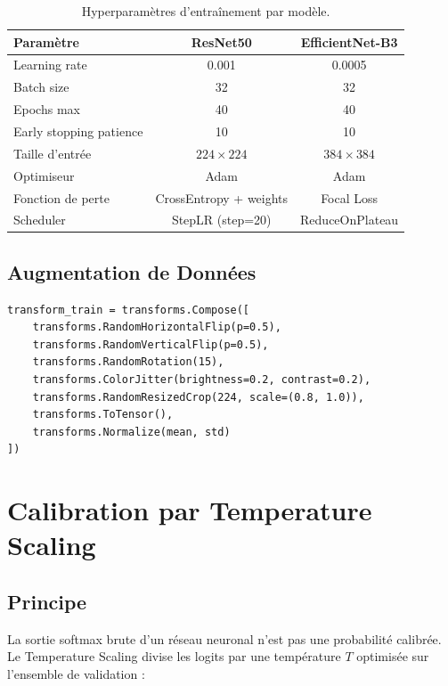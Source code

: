 \documentclass[12pt,a4paper,oneside]{report}
\begin{document}
\begin{table}[H]
\centering
\caption{Hyperparamètres d'entraînement par modèle.}
\label{tab:hyperparams}
\begin{tabular}{|l|c|c|}
\hline
\textbf{Paramètre} & \textbf{ResNet50} & \textbf{EfficientNet-B3} \\
\hline
Learning rate & 0.001 & 0.0005 \\
Batch size & 32 & 32 \\
Epochs max & 40 & 40 \\
Early stopping patience & 10 & 10 \\
Taille d'entrée & $224 \times 224$ & $384 \times 384$ \\
Optimiseur & Adam & Adam \\
Fonction de perte & CrossEntropy + weights & Focal Loss \\
Scheduler & StepLR (step=20) & ReduceOnPlateau \\
\hline
\end{tabular}
\end{table}

\subsection{Augmentation de Données}

\begin{lstlisting}[caption={Pipeline d'augmentation de données.}]
transform_train = transforms.Compose([
    transforms.RandomHorizontalFlip(p=0.5),
    transforms.RandomVerticalFlip(p=0.5),
    transforms.RandomRotation(15),
    transforms.ColorJitter(brightness=0.2, contrast=0.2),
    transforms.RandomResizedCrop(224, scale=(0.8, 1.0)),
    transforms.ToTensor(),
    transforms.Normalize(mean, std)
])
\end{lstlisting}

\section{Calibration par Temperature Scaling}

\subsection{Principe}

La sortie softmax brute d'un réseau neuronal n'est pas une probabilité
calibrée. Le Temperature Scaling divise les logits par une température
$T$ optimisée sur l'ensemble de validation :
\end{document}
